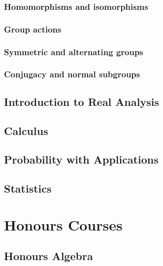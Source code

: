 \documentclass[12pt]{report}
\begin{document}
\section{Homomorphisms and isomorphisms}\label{sec:intro-to-group-theory:homomorphisms} %

\section{Group actions}\label{sec:intro-to-group-theory:group-actions} %

\section{Symmetric and alternating groups}\label{sec:intro-to-group-theory:symmetric-alternating-groups} %

\section{Conjugacy and normal subgroups}\label{sec:intro-to-group-theory:conjugacy-normal-subgroups} %











\chapter{Introduction to Real Analysis}\label{cha:intr-real-analys}
\chapter{Calculus}\label{cha:calculus}
\chapter{Probability with Applications}\label{cha:prob-with-appl}
\chapter{Statistics}\label{cha:statistics}

\part{Honours Courses}
\chapter{Honours Algebra}\label{cha:honours-algebra}
\end{document}
